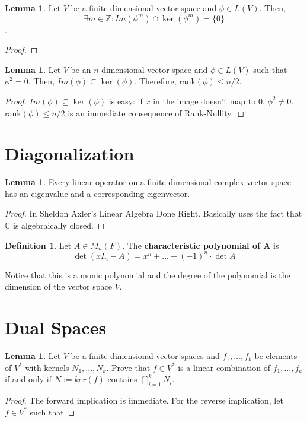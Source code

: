 \documentclass{article}
\theoremstyle{definition}
\newtheorem{definition}{Definition}
\newtheorem{lemma}[theorem]{Lemma}
\newcommand{\Z}{\mathbb{Z}}
\newcommand{\C}{\mathbb{C}}
\begin{document}
\begin{lemma}
    Let $V$ be a finite dimensional vector space and $\phi \in L(V)$.
    Then, \[\exists m \in \Z: Im(\phi^{m}) \cap \ker(\phi^{m}) = \{0\}\].
\end{lemma}
\begin{proof}
    
\end{proof}

\begin{lemma}
    Let $V$ be an $n$ dimensional vector space and $\phi \in L(V)$ such that $\phi^{2} = 0$.
    Then, $Im(\phi) \subseteq \ker(\phi)$. Therefore, rank$(\phi) \leq n/2$.
\end{lemma}
\begin{proof}
    $Im(\phi) \subseteq \ker(\phi)$ is easy: if $x$ in the image
    doesn't map to 0, $\phi^{2} \neq 0$. rank$(\phi) \leq n/2$
    is an immediate consequence of Rank-Nullity.
\end{proof}

\section{Diagonalization}

\begin{lemma}
    Every linear operator on a finite-dimensional complex vector space
    has an eigenvalue and a corresponding eigenvector.
\end{lemma}
\begin{proof}
    In Sheldon Axler's Linear Algebra Done Right. Basically uses the 
    fact that $\C$ is algebraically closed.
\end{proof}

\begin{definition}
    Let $A \in M_{n}(F)$. The \textbf{characteristic polynomial of A}
    is \[\det{(xI_{n} -A)} = x^{n} + ... + (-1)^{n} \cdot \det{A}\]

\end{definition}

Notice that this is a monic polynomial and the degree of the polynomial
is the dimension of the vector space $V$.

\newpage

\section{Dual Spaces}

\begin{lemma}
    Let $V$ be a finite dimensional vector spaces and $f_{1},...,f_{k}$ be
    elements of $V^{*}$ with kernels $N_{1},...,N_{k}$. Prove that $f \in V^{*}$ is a linear combination
    of $f_{1},...,f_{k}$ if and only if $N := ker(f)$ contains $\bigcap_{i = 1}^{k} N_{i}$.
\end{lemma}
\begin{proof}
    The forward implication is immediate. For the reverse implication, let $f \in V^{*}$
    such that 
\end{proof}
\end{document}
